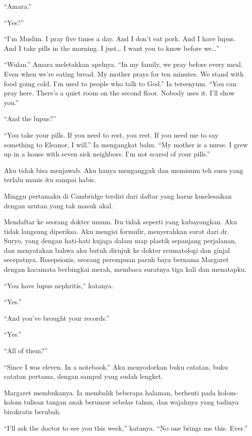 \documentclass[11pt,twoside,openany]{book}
\makeatletter
\newcommand{\scenebreak}{\par\vspace{0.9em}{\centering\textsc{*\hspace{0.7em}*\hspace{0.7em}*}\par}\vspace{0.9em}\@afterindentfalse\@afterheading}
\makeatother
\begin{document}
``Amara.''

``Yes?''

``I'm Muslim. I pray five times a day. And I don't eat pork. And I have lupus. And I take pills in the morning. I just\ldots{} I want you to know before we\ldots{}''

``Wulan.'' Amara meletakkan apelnya. ``In my family, we pray before every meal. Even when we're eating bread. My mother prays for ten minutes. We stand with food going cold. I'm used to people who talk to God.'' Ia tersenyum. ``You can pray here. There's a quiet room on the second floor. Nobody uses it. I'll show you.''

``And the lupus?''

``You take your pills. If you need to rest, you rest. If you need me to say something to Eleanor, I will.'' Ia mengangkat bahu. ``My mother is a nurse. I grew up in a house with seven sick neighbors. I'm not scared of your pills.''

Aku tidak bisa menjawab. Aku hanya mengangguk dan meminum teh susu yang terlalu manis itu sampai habis.

\scenebreak
Minggu pertamaku di Cambridge terdiri dari daftar yang harus kuselesaikan dengan urutan yang tak masuk akal.

Mendaftar ke seorang dokter umum. Itu tidak seperti yang kubayangkan. Aku tidak langsung diperiksa. Aku mengisi formulir, menyerahkan surat dari dr. Suryo, yang dengan hati-hati kujaga dalam map plastik sepanjang perjalanan, dan menyatakan bahwa aku butuh dirujuk ke dokter reumatologi dan ginjal secepatnya. Resepsionis, seorang perempuan paruh baya bernama Margaret dengan kacamata berbingkai merah, membaca suratnya tiga kali dan menatapku.

``You have lupus nephritis,'' katanya.

``Yes.''

``And you've brought your records.''

``Yes.''

``All of them?''

``Since I was eleven. In a notebook.'' Aku menyodorkan buku catatan, buku catatan pertama, dengan sampul yang sudah lengket.

Margaret membukanya. Ia membalik beberapa halaman, berhenti pada kolom-kolom tulisan tangan anak berumur sebelas tahun, dan wajahnya yang tadinya birokratis berubah.

``I'll ask the doctor to see you this week,'' katanya. ``No one brings me this. Ever.''
\end{document}
